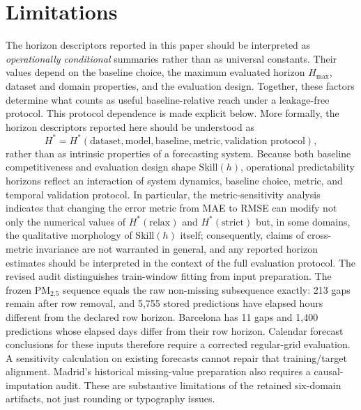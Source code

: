 \documentclass[pdflatex,sn-mathphys]{sn-jnl}
\begin{document}
\section{Limitations}
The horizon descriptors reported in this paper should be interpreted as
\emph{operationally conditional} summaries rather than as universal
constants. Their values depend on the baseline choice, the maximum
evaluated horizon $H_{\max}$, dataset and domain properties, and the
evaluation design. Together, these factors determine what counts as
useful baseline-relative reach under a leakage-free protocol. This
protocol dependence is made explicit below.
More formally, the horizon descriptors reported here should be understood as
\[
H^* = H^*(\text{dataset}, \text{model}, \text{baseline}, \text{metric}, \text{validation protocol}),
\]
rather than as intrinsic properties of a forecasting system. Because both baseline competitiveness and evaluation design shape $\mathrm{Skill}(h)$, operational predictability horizons reflect an interaction of system dynamics, baseline choice, metric, and temporal validation protocol. In particular, the metric-sensitivity analysis indicates that changing the error metric from MAE to RMSE can modify not only the numerical values of $H^*(\mathrm{relax})$ and $H^*(\mathrm{strict})$ but, in some domains, the qualitative morphology of $\mathrm{Skill}(h)$ itself; consequently, claims of cross-metric invariance are not warranted in general, and any reported horizon estimates should be interpreted in the context of the full evaluation protocol.
The revised audit distinguishes train-window fitting from input preparation.
The frozen PM$_{2.5}$ sequence equals the raw non-missing subsequence exactly:
213 gaps remain after row removal, and 5,755 stored predictions have elapsed
hours different from the declared row horizon. Barcelona has 11 gaps and
1,400 predictions whose elapsed days differ from their row horizon. Calendar
forecast conclusions for these inputs therefore require a corrected regular-grid
evaluation. A sensitivity calculation on existing forecasts cannot repair that
training/target alignment. Madrid's historical missing-value preparation also
requires a causal-imputation audit. These are substantive limitations of the
retained six-domain artifacts, not just rounding or typography issues.
\end{document}
